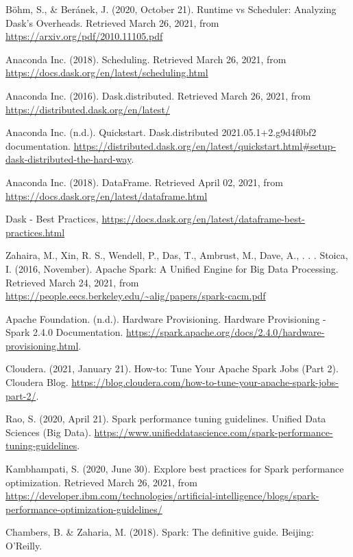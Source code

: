 \documentclass[11pt, oneside]{book}
\begin{document}
\begin{thebibliography}{111}
 Böhm, S., \& Beránek, J. (2020, October 21). Runtime vs Scheduler: Analyzing Dask’s Overheads. Retrieved March 26, 2021, from \url{https://arxiv.org/pdf/2010.11105.pdf}

 Anaconda Inc. (2018). Scheduling. Retrieved March 26, 2021, from \url{https://docs.dask.org/en/latest/scheduling.html}

 Anaconda Inc. (2016). Dask.distributed. Retrieved March 26, 2021, from \url{https://distributed.dask.org/en/latest/}

 Anaconda Inc. (n.d.). Quickstart. Dask.distributed 2021.05.1+2.g9d4f0bf2 documentation. \url{https://distributed.dask.org/en/latest/quickstart.html#setup-dask-distributed-the-hard-way}. 

 Anaconda Inc. (2018). DataFrame. Retrieved April 02, 2021, from \url{https://docs.dask.org/en/latest/dataframe.html}

 Dask - Best Practices, \url{https://docs.dask.org/en/latest/dataframe-best-practices.html}

 Zahaira, M., Xin, R. S., Wendell, P., Das, T., Ambrust, M., Dave, A., . . . Stoica, I. (2016, November). Apache Spark: A Unified Engine for Big Data Processing. Retrieved March 24, 2021, from \url{https://people.eecs.berkeley.edu/~alig/papers/spark-cacm.pdf}

 Apache Foundation. (n.d.). Hardware Provisioning. Hardware Provisioning - Spark 2.4.0 Documentation. \url{https://spark.apache.org/docs/2.4.0/hardware-provisioning.html}.

 Cloudera. (2021, January 21). How-to: Tune Your Apache Spark Jobs (Part 2). Cloudera Blog. \url{https://blog.cloudera.com/how-to-tune-your-apache-spark-jobs-part-2/}. 

 Rao, S. (2020, April 21). Spark performance tuning guidelines. Unified Data Sciences (Big Data). \url{https://www.unifieddatascience.com/spark-performance-tuning-guidelines}. 

 Kambhampati, S. (2020, June 30). Explore best practices for Spark performance optimization. Retrieved March 26, 2021, from \url{https://developer.ibm.com/technologies/artificial-intelligence/blogs/spark-performance-optimization-guidelines/}

 Chambers, B. \& Zaharia, M. (2018). Spark: The definitive guide. Beijing: O'Reilly.


\end{thebibliography}
\end{document}
